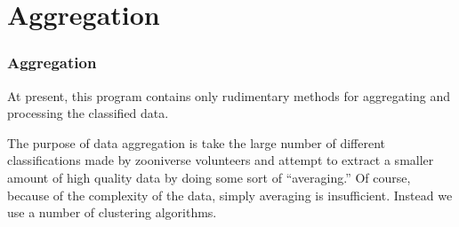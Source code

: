 \documentclass{beamer}
\begin{document}
\section{Aggregation}%

\begin{frame}[t]
    \frametitle{Aggregation}

    At present, this program contains only rudimentary methods for aggregating and processing the classified data.

The purpose of data aggregation is take the large number of different classifications made by zooniverse volunteers and attempt to extract a smaller amount of high quality data by doing some sort of “averaging.” Of course, because of the complexity of the data, simply averaging is insufficient. Instead we use a number of clustering algorithms. 
\end{frame}
\end{document}
